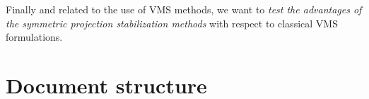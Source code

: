 Finally and related to the use of VMS methods, we want to \emph{test the advantages of the symmetric projection stabilization methods} with respect to classical VMS formulations.
%
%
%
%
%

\section{Document structure}
